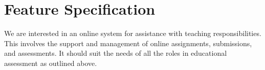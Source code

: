 
\chapter{Feature Specification}

We are interested in an online system for assistance with teaching
responsibilities. This involves the support and management of online
assignments, submissions, and assessments. It should suit the needs of all the
roles in educational assessment as outlined above.















